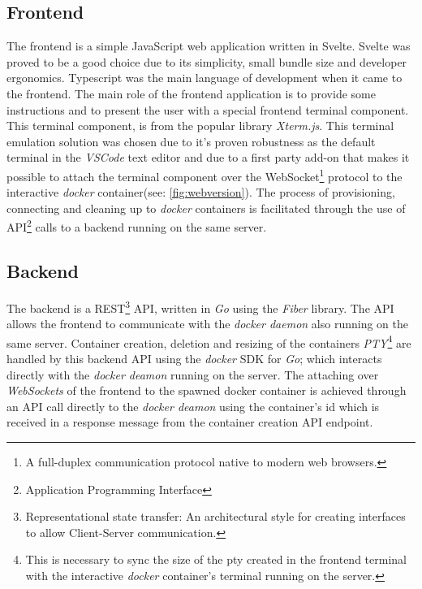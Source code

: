 \subsection{Frontend} The frontend is a simple JavaScript web application
written in Svelte. Svelte was proved to be a good choice due to its simplicity,
small bundle size and developer ergonomics. Typescript was the main language of
development when it came to the frontend. The main role of the frontend
application is to provide some instructions and to present the user with a
special frontend terminal component. This terminal component, is from the
popular library \textit{Xterm.js}. This terminal emulation solution was chosen
due to it's proven robustness as the default terminal in the \textit{VSCode}
text editor and due to a first party add-on that makes it possible to attach
the terminal component over the WebSocket\footnote{A full-duplex communication
protocol native to modern web browsers.} protocol to the interactive
\textit{docker} container(see: \autoref{fig:webversion}). The process of
provisioning, connecting and cleaning up to \textit{docker} containers is
facilitated through the use of API\footnote{Application Programming Interface}
calls to a backend running on the same server. 

\subsection{Backend} The backend is a REST\footnote{Representational state
transfer: An architectural style for creating interfaces to allow Client-Server
communication.} API, written in \textit{Go} using the \textit{Fiber} library.
The API allows the frontend to communicate with the \textit{docker daemon} also
running on the same server. Container creation, deletion and resizing of the
containers \textit{PTY}\footnote{This is necessary to sync the size of the pty
created in the frontend terminal with the interactive \textit{docker}
container's terminal running on the server.} are handled by this backend API
using the \textit{docker} SDK for \textit{Go}; which interacts directly with
the \textit{docker deamon} running on the server. The attaching over
\textit{WebSockets} of the frontend to the spawned docker container is achieved
through an API call directly to the \textit{docker deamon} using the
container's id which is received in a response message from the container
creation API endpoint.

